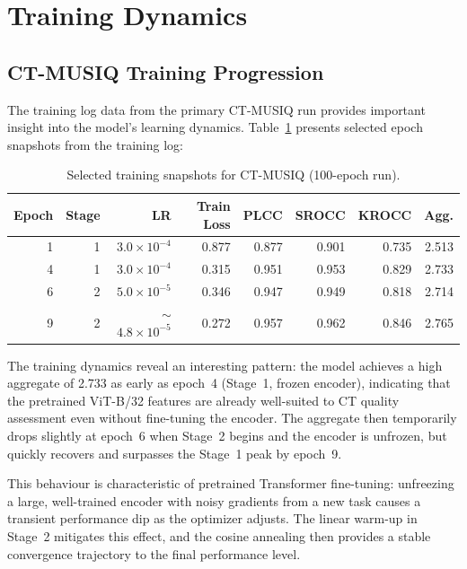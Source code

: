 \section{Training Dynamics}
\label{sec:results_training_curves}

\subsection{CT-MUSIQ Training Progression}

The training log data from the primary CT-MUSIQ run provides important insight into the
model's learning dynamics. Table~\ref{tab:training_epochs} presents selected epoch
snapshots from the training log:

\begin{table}[h]
    \centering
    \caption{Selected training snapshots for CT-MUSIQ (100-epoch run).}
    \label{tab:training_epochs}
    \begin{tabular}{rrrrrrrr}
        \toprule
        \textbf{Epoch} & \textbf{Stage} & \textbf{LR} & \textbf{Train Loss}
        & \textbf{PLCC} & \textbf{SROCC} & \textbf{KROCC} & \textbf{Agg.} \\
        \midrule
        1  & 1 & $3.0 \times 10^{-4}$ & 0.877 & 0.877 & 0.901 & 0.735 & 2.513 \\
        4  & 1 & $3.0 \times 10^{-4}$ & 0.315 & 0.951 & 0.953 & 0.829 & 2.733 \\
        6  & 2 & $5.0 \times 10^{-5}$ & 0.346 & 0.947 & 0.949 & 0.818 & 2.714 \\
        9  & 2 & $\sim$$4.8 \times 10^{-5}$ & 0.272 & 0.957 & 0.962 & 0.846 & 2.765 \\
        \bottomrule
    \end{tabular}
\end{table}

The training dynamics reveal an interesting pattern: the model achieves a high aggregate
of 2.733 as early as epoch~4 (Stage~1, frozen encoder), indicating that the pretrained
ViT-B/32 features are already well-suited to CT quality assessment even without
fine-tuning the encoder. The aggregate then temporarily drops slightly at epoch~6 when
Stage~2 begins and the encoder is unfrozen, but quickly recovers and surpasses the Stage~1
peak by epoch~9.

This behaviour is characteristic of pretrained Transformer fine-tuning: unfreezing a
large, well-trained encoder with noisy gradients from a new task causes a transient
performance dip as the optimizer adjusts. The linear warm-up in Stage~2 mitigates this
effect, and the cosine annealing then provides a stable convergence trajectory to the
final performance level.

